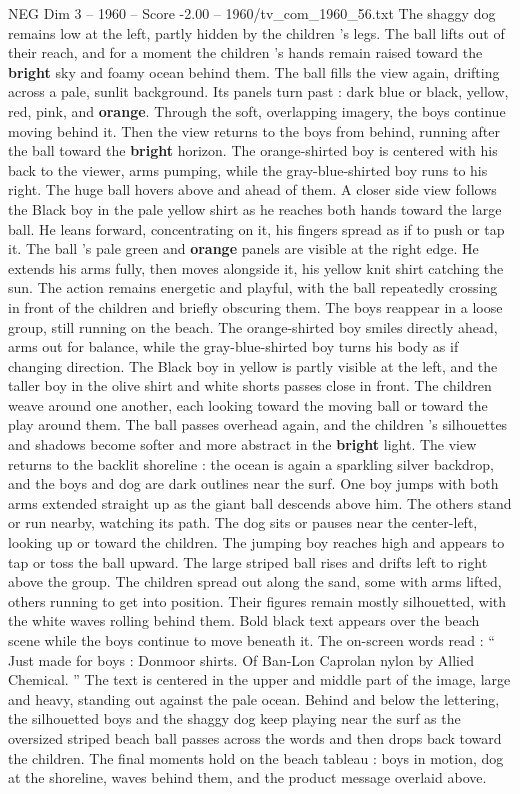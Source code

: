 \begin{textsample}{NEG Dim 3 – 1960 – Score -2.00 – 1960/tv\_com\_1960\_56.txt}
The shaggy dog remains low at the left, partly hidden by the children ’s legs.
The ball lifts out of their reach, and for a moment the children ’s hands remain raised toward the \textbf{bright} sky and foamy ocean behind them.
The ball fills the view again, drifting across a pale, sunlit background.
Its panels turn past : dark blue or black, yellow, red, pink, and \textbf{orange}.
Through the soft, overlapping imagery, the boys continue moving behind it.
Then the view returns to the boys from behind, running after the ball toward the \textbf{bright} horizon.
The orange-shirted boy is centered with his back to the viewer, arms pumping, while the gray-blue-shirted boy runs to his right.
The huge ball hovers above and ahead of them.
A closer side view follows the Black boy in the pale yellow shirt as he reaches both hands toward the large ball.
He leans forward, concentrating on it, his fingers spread as if to push or tap it.
The ball ’s pale green and \textbf{orange} panels are visible at the right edge.
He extends his arms fully, then moves alongside it, his yellow knit shirt catching the sun.
The action remains energetic and playful, with the ball repeatedly crossing in front of the children and briefly obscuring them.
The boys reappear in a loose group, still running on the beach.
The orange-shirted boy smiles directly ahead, arms out for balance, while the gray-blue-shirted boy turns his body as if changing direction.
The Black boy in yellow is partly visible at the left, and the taller boy in the olive shirt and white shorts passes close in front.
The children weave around one another, each looking toward the moving ball or toward the play around them.
The ball passes overhead again, and the children ’s silhouettes and shadows become softer and more abstract in the \textbf{bright} light.
The view returns to the backlit shoreline : the ocean is again a sparkling silver backdrop, and the boys and dog are dark outlines near the surf.
One boy jumps with both arms extended straight up as the giant ball descends above him.
The others stand or run nearby, watching its path.
The dog sits or pauses near the center-left, looking up or toward the children.
The jumping boy reaches high and appears to tap or toss the ball upward.
The large striped ball rises and drifts left to right above the group.
The children spread out along the sand, some with arms lifted, others running to get into position.
Their figures remain mostly silhouetted, with the white waves rolling behind them.
Bold black text appears over the beach scene while the boys continue to move beneath it.
The on-screen words read : “ Just made for boys : Donmoor shirts.
Of Ban-Lon Caprolan nylon by Allied Chemical. ” The text is centered in the upper and middle part of the image, large and heavy, standing out against the pale ocean.
Behind and below the lettering, the silhouetted boys and the shaggy dog keep playing near the surf as the oversized striped beach ball passes across the words and then drops back toward the children.
The final moments hold on the beach tableau : boys in motion, dog at the shoreline, waves behind them, and the product message overlaid above.

\end{textsample}
